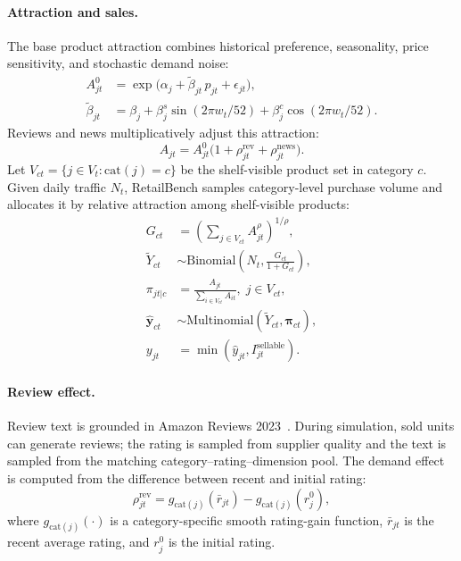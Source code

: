 \paragraph{Attraction and sales.}
The base product attraction combines historical preference, seasonality, price sensitivity, and stochastic demand noise:
\begin{equation}
\begin{aligned}
A^{0}_{jt}
&=\exp\bigl(\alpha_j+\tilde\beta_{jt}\,p_{jt}+\epsilon_{jt}\bigr),\\
\tilde\beta_{jt}
&=\beta_j+\beta^s_j\sin(2\pi w_t/52)+\beta^c_j\cos(2\pi w_t/52).
\end{aligned}
\label{eq:base_attraction}
\end{equation}
Reviews and news multiplicatively adjust this attraction:
\begin{equation}
A_{jt}=A^{0}_{jt}\bigl(1+\rho^{\mathrm{rev}}_{jt}+\rho^{\mathrm{news}}_{jt}\bigr).
\label{eq:adjusted_attraction}
\end{equation}
Let $V_{ct}=\{j\in V_t:\mathrm{cat}(j)=c\}$ be the shelf-visible product set in category $c$. Given daily traffic $N_t$, RetailBench samples category-level purchase volume and allocates it by relative attraction among shelf-visible products:
\begin{equation}
\begin{aligned}
G_{ct}
&=\left(\sum_{j\in V_{ct}} A_{jt}^{\rho}\right)^{1/\rho},\\
\tilde Y_{ct}
&\sim \mathrm{Binomial}\!\left(N_t,\frac{G_{ct}}{1+G_{ct}}\right),\\
\pi_{jt|c}
&=\frac{A_{jt}}{\sum_{i\in V_{ct}}A_{it}},\; j\in V_{ct},\\
\hat{\mathbf{y}}_{ct}
&\sim \mathrm{Multinomial}\!\left(\tilde Y_{ct},\boldsymbol{\pi}_{ct}\right),\\
y_{jt}
&=\min\!\left(\hat y_{jt}, I_{jt}^{\mathrm{sellable}}\right).
\end{aligned}
\label{eq:demand_sales}
\end{equation}

\paragraph{Review effect.}
Review text is grounded in Amazon Reviews 2023~\citep{hou2024bridging}. During simulation, sold units can generate reviews; the rating is sampled from supplier quality and the text is sampled from the matching category--rating--dimension pool. The demand effect is computed from the difference between recent and initial rating:
\begin{equation}
\rho^{\mathrm{rev}}_{jt}
=g_{\mathrm{cat}(j)}(\bar r_{jt})-g_{\mathrm{cat}(j)}(r^{0}_{j}),
\label{eq:review_effect}
\end{equation}
where $g_{\mathrm{cat}(j)}(\cdot)$ is a category-specific smooth rating-gain function, $\bar r_{jt}$ is the recent average rating, and $r^{0}_{j}$ is the initial rating.

